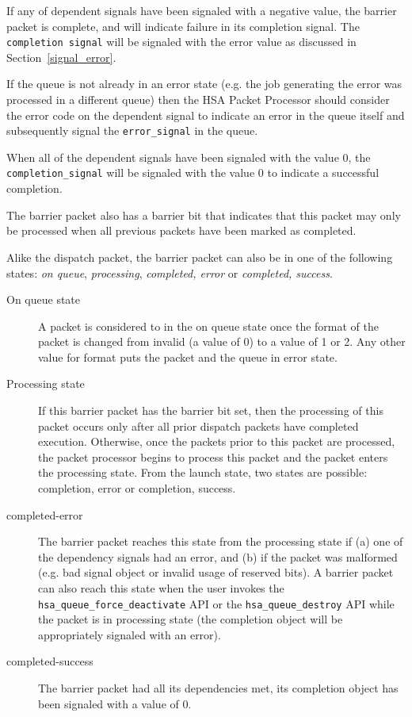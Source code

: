 

If any of dependent signals have been signaled with a negative
value, the barrier packet is complete, and will indicate failure in
its completion signal. The \texttt{completion signal} will be
signaled with the error value as discussed in
Section~\ref{signal_error}.

If the queue is not already in an error state (e.g. the job
generating the error was processed in a different queue) then the
HSA Packet Processor should consider the error code on the dependent
signal to indicate an error in the queue itself and subsequently
signal the \texttt{error\_signal} in the queue.

When all of the dependent signals have been signaled with the value
0, the \texttt{completion\_signal} will be signaled with the value 0 to
indicate a successful completion.

The barrier packet also has a barrier bit that indicates that this
packet may only be processed when all previous packets have been
marked as completed.

Alike the dispatch packet, the barrier packet can also be in one of
the following states: \emph{on queue}, \emph{processing},
\emph{completed, error} or \emph{completed, success}.

\begin{description}

\item[On queue state] A packet is considered to in the on queue
state once the format of the packet is changed from invalid (a value
of 0) to a value of 1 or 2. Any other value for format puts the
packet and the queue in error state.

\item[Processing state] If this barrier packet has the barrier bit set,
then the processing of this packet occurs only after all prior
dispatch packets have completed execution.  Otherwise, once the
packets prior to this packet are processed, the packet processor
begins to process this packet and the packet enters the processing
state.  From the launch state, two states are possible: completion,
error or completion, success.

\item[completed-error] The barrier packet reaches this state from
the processing state if (a) one of the dependency signals had an
error, and (b) if the packet was malformed (e.g. bad signal object
or invalid usage of reserved bits). A barrier packet can also reach
this state when the user invokes the
\texttt{hsa\_queue\_force\_deactivate} API or the
\texttt{hsa\_queue\_destroy} API while the packet is in processing
state (the completion object will be appropriately signaled with an
error).

\item[completed-success] The barrier packet had all its dependencies
met, its completion object has been signaled with a value of 0.

\end{description}

